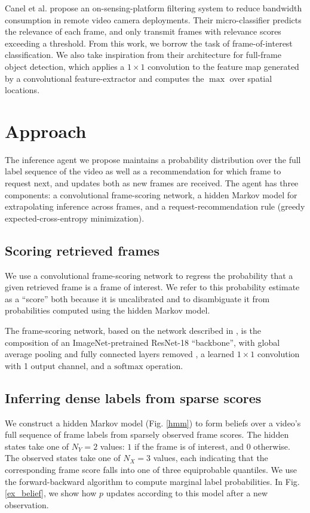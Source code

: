 \documentclass[10pt,twocolumn,letterpaper]{article}
\begin{document}
Canel et al. \cite{canel2019scaling} propose an on-sensing-platform filtering system to reduce bandwidth consumption in remote video camera deployments. Their micro-classifier predicts the relevance of each frame, and only transmit frames with relevance scores exceeding a threshold. From this work, we borrow the task of frame-of-interest classification. We also take inspiration from their architecture for full-frame object detection, which applies a $1 \times 1$ convolution to the feature map generated by a convolutional feature-extractor and computes the $\max$ over spatial locations.

\section{Approach}

The inference agent we propose maintains a probability distribution over the full label sequence of the video as well as a recommendation for which frame to request next, and updates both as new frames are received. The agent has three components: a convolutional frame-scoring network, a hidden Markov model for extrapolating inference across frames, and a request-recommendation rule (greedy expected-cross-entropy minimization).

\subsection{Scoring retrieved frames}

We use a convolutional frame-scoring network to regress the probability that a given retrieved frame is a frame of interest. We refer to this probability estimate as a ``score'' both because it is uncalibrated \cite{guo2017calibration} and to disambiguate it from probabilities computed using the hidden Markov model.

The frame-scoring network, based on the network described in \cite{canel2019scaling}, is the composition of an ImageNet-pretrained ResNet-18 ``backbone'', with global average pooling and fully connected layers removed \cite{russakovsky2015imagenet,he2016resnet}, a learned $1 \times 1$ convolution with 1 output channel, and a $\mathrm{softmax}$ operation.

\subsection{Inferring dense labels from sparse scores}

We construct a hidden Markov model (Fig. \ref{hmm}) to form beliefs over a video's full sequence of frame labels from sparsely observed frame scores. The hidden states take one of $N_Y=2$ values: $1$ if the frame is of interest, and $0$ otherwise. The observed states take one of $N_X = 3$ values, each indicating that the corresponding frame score falls into one of three equiprobable quantiles. We use the forward-backward algorithm \cite{rabiner1986introduction} to compute marginal label probabilities. In Fig. \ref{ex_belief}, we show how $p$ updates according to this model after a new observation.
\end{document}
